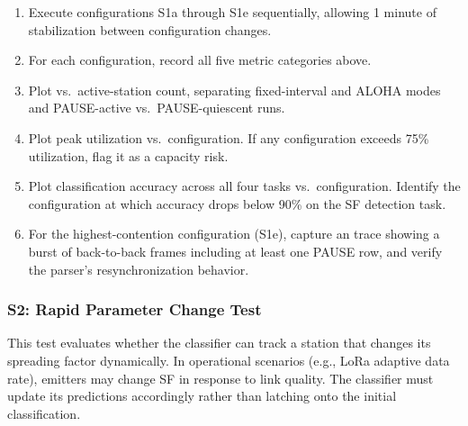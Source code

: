 \documentclass[11pt,letterpaper]{article}
\begin{document}
	\begin{tcolorbox}[infobox={Exercise: Density Stress Test}]
		\begin{enumerate}
			\item Execute configurations S1a through S1e sequentially, allowing 1 minute of stabilization between configuration changes.
			\item For each configuration, record all five metric categories above.
			\item Plot \PER{} vs.\ active-station count, separating fixed-interval and ALOHA modes and PAUSE-active vs.\ PAUSE-quiescent runs.
			\item Plot \FIFO{} peak utilization vs.\ configuration. If any configuration exceeds 75\% \FIFO{} utilization, flag it as a capacity risk.
			\item Plot classification accuracy across all four tasks vs.\ configuration. Identify the configuration at which accuracy drops below 90\% on the SF detection task.
			\item For the highest-contention configuration (S1e), capture an \ILA{} trace showing a burst of back-to-back frames including at least one PAUSE row, and verify the parser's resynchronization behavior.
		\end{enumerate}
	\end{tcolorbox}

	\subsubsection{S2: Rapid Parameter Change Test}

	This test evaluates whether the classifier can track a station that changes its spreading factor dynamically. In operational scenarios (e.g., LoRa adaptive data rate), emitters may change SF in response to link quality. The classifier must update its predictions accordingly rather than latching onto the initial classification.
\end{document}
